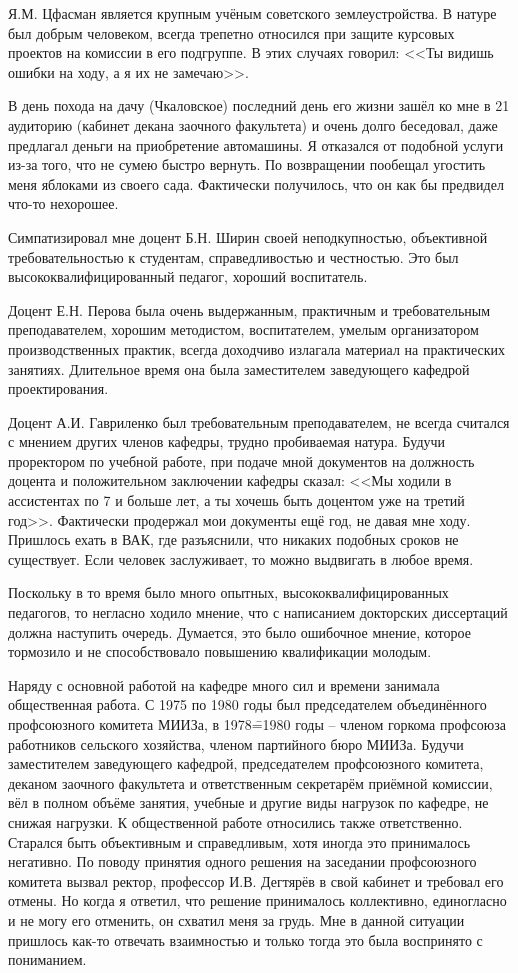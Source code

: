 Я.М. Цфасман является крупным учёным советского землеустройства. В натуре был добрым человеком, всегда трепетно относился при защите курсовых проектов на комиссии в его подгруппе. В этих случаях говорил: <<Ты видишь ошибки на ходу, а я их не замечаю>>.

В день похода на дачу (Чкаловское) последний день его жизни зашёл ко мне в 21 аудиторию (кабинет декана заочного факультета) и очень долго беседовал, даже предлагал деньги на приобретение автомашины. Я отказался от подобной услуги из-за того, что не сумею быстро вернуть. По возвращении пообещал угостить меня яблоками из своего сада. Фактически получилось, что он как бы предвидел что-то нехорошее.

Симпатизировал мне доцент Б.Н. Ширин своей неподкупностью, объективной требовательностью к студентам, справедливостью и честностью. Это был высококвалифицированный педагог, хороший воспитатель.

Доцент Е.Н. Перова была очень выдержанным, практичным и требовательным преподавателем, хорошим методистом, воспитателем, умелым организатором производственных практик, всегда доходчиво излагала материал на практических занятиях. Длительное время она была заместителем заведующего кафедрой проектирования.

Доцент А.И. Гавриленко был требовательным преподавателем, не всегда считался с мнением других членов кафедры, трудно пробиваемая натура. Будучи проректором по учебной работе, при подаче мной документов на должность доцента и положительном заключении кафедры сказал: <<Мы ходили в ассистентах по 7 и больше лет, а ты хочешь быть доцентом уже на третий год>>. Фактически продержал мои документы ещё год, не давая мне ходу. Пришлось ехать в ВАК, где разъяснили, что никаких подобных сроков не существует. Если человек заслуживает, то можно выдвигать в любое время.

Поскольку в то время было много опытных, высококвалифицированных педагогов, то негласно ходило мнение, что с написанием докторских диссертаций должна наступить очередь. Думается, это было ошибочное мнение, которое тормозило и не способствовало повышению квалификации молодым.

Наряду с основной работой на кафедре много сил и времени занимала общественная работа. С 1975 по 1980 годы был председателем объединённого профсоюзного комитета МИИЗа, в 1978\==1980 годы \--- членом горкома профсоюза работников сельского хозяйства, членом партийного бюро МИИЗа. Будучи заместителем заведующего кафедрой, председателем профсоюзного комитета, деканом заочного факультета и ответственным секретарём приёмной комиссии, вёл в полном объёме занятия, учебные и другие виды нагрузок по кафедре, не снижая нагрузки. К общественной работе относились также ответственно. Старался быть объективным и справедливым, хотя иногда это принималось негативно. По поводу принятия одного решения на заседании профсоюзного комитета вызвал ректор, профессор И.В. Дегтярёв в свой кабинет и требовал его отмены. Но когда я ответил, что решение принималось коллективно, единогласно и не могу его отменить, он схватил меня за грудь. Мне в данной ситуации пришлось как-то отвечать взаимностью и только тогда это была воспринято с пониманием.

